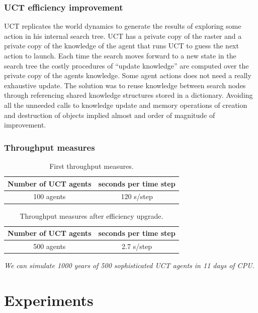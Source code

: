 \documentclass[11pt,oneside,a4paper,openright]{report}
\begin{document}
\subsection{UCT efficiency improvement}

UCT replicates the world dynamics to generate the results of exploring some action in his internal search tree. UCT has a private copy of the raster and a private copy of the knowledge of the agent that runs UCT to guess the next action to launch.
Each time the search moves forward to a new state in the search tree the costly procedures of ``update knowledge''
are computed over the private copy of the agents knowledge. Some agent actions does not need a really exhaustive update. The solution was to reuse knowledge between search nodes through referencing shared knowledge structures stored
in a dictionary. Avoiding all the unneeded calls to knowledge update and memory operations of creation and destruction
of objects implied almost and order of magnitude of improvement.

 
\subsection{Throughput measures}



\begin{table}[ht!]
	\centering
	\begin{tabular}{|c|c|}
		\hline
		Number of UCT agents	& seconds per time step \\
		\hline
		100 agents		& 120 s/step
		\hline
	\end{tabular}
	\caption{First throughput measures.}
	\label{tab:secondsPerTimeStepInitial}
	\end{table}


\begin{table}[ht!]
	\centering
	\begin{tabular}{|c|c|}
		\hline
		Number of UCT agents	& seconds per time step \\
		\hline
		500 agents		& 2.7 s/step
		\hline
	\end{tabular}
	\caption{Throughput measures after efficiency upgrade.}
	\label{tab:secondsPerTimeStepImproved}
	\end{table}

	\emph{We can simulate 1000 years of 500 sophisticated UCT agents in 11 days of CPU.}

\chapter{Experiments}
\end{document}
